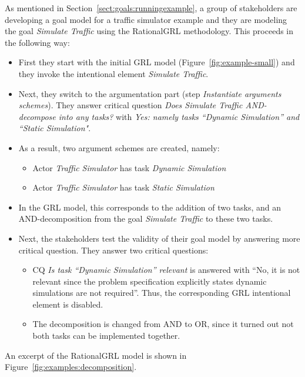 As mentioned in Section~\ref{sect:goals:runningexample}, a group of stakeholders are developing a goal model for a traffic simulator example and they are modeling the goal \emph{Simulate Traffic} using the RationalGRL methodology. This proceeds in the following way:
\begin{itemize}
\item
First they start %
with the initial GRL model (Figure~\ref{fig:example-small}) and they invoke the intentional element \emph{Simulate Traffic}. 
\item Next, they switch to the argumentation part (step \emph{Instantiate arguments schemes}). They answer critical question \emph{Does Simulate Traffic AND-decompose into any tasks?} with \emph{Yes: namely tasks ``Dynamic Simulation'' and ``Static Simulation"}.
\item As a result, two argument schemes are created, namely:
\begin{itemize}
\item Actor \emph{Traffic Simulator} has task \emph{Dynamic Simulation}
\item Actor \emph{Traffic Simulator} has task \emph{Static Simulation}
\end{itemize}
\item In the GRL model, this corresponds to the addition of two tasks, and an AND-decomposition from the goal \emph{Simulate Traffic} to these two tasks.
\item Next, the stakeholders test the validity of their goal model by answering more critical question. They answer two critical questions:
\begin{itemize}
\item
CQ \emph{Is task ``Dynamic Simulation'' relevant} is answered with ``No, it is not relevant since the problem specification explicitly states dynamic simulations are not required''. Thus, the corresponding GRL intentional element is disabled.
\item The decomposition is changed from AND to OR, since it turned out not both tasks can be implemented together.
\end{itemize}
\end{itemize}

An excerpt of the RationalGRL model is shown in Figure~\ref{fig:examples:decomposition}. %
\fi

